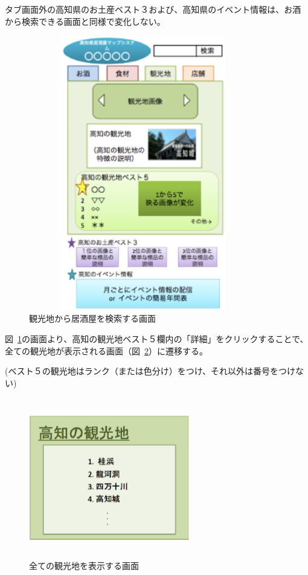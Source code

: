 \documentclass[a4j,titlepage]{jarticle}
\begin{document}
タブ画面外の高知県のお土産ベスト３および、高知県のイベント情報は、お酒から検索できる画面と同様で変化しない。
\clearpage
\begin {figure}[!htbp]
    \begin{center}
    \includegraphics [height=12cm, width=10cm]{12.eps}
    \caption {観光地から居酒屋を検索する画面}
    \label {fig:12}
    \end{center}
\end {figure}

図~\ref{fig:12}の画面より、高知の観光地ベスト５欄内の「詳細」をクリックすることで、全ての観光地が表示される画面（図~\ref{fig:13}）に遷移する。

(ベスト５の観光地はランク（または色分け）をつけ、それ以外は番号をつけない)
\clearpage
\begin {figure}[!htbp]
    \begin{center}
    \includegraphics [height=7cm, width=7cm]{13.eps}
    \caption {全ての観光地を表示する画面}
    \label {fig:13}
    \end{center}
\end {figure}
\end{document}
